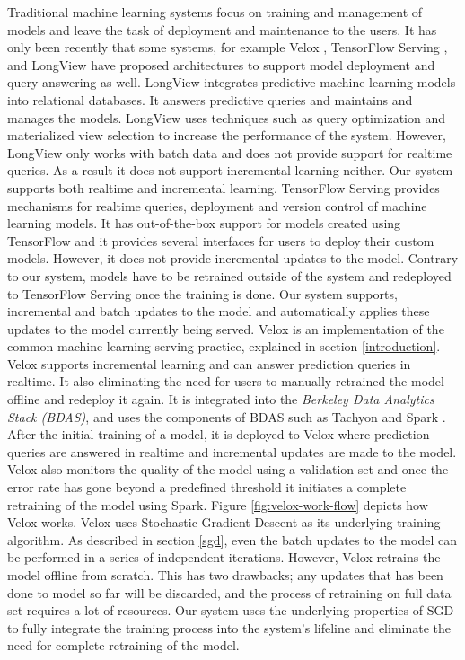 \documentclass{sig-alternate-05-2015}
\begin{document}
Traditional machine learning systems focus on training and management of models and leave the task of deployment and maintenance to the users. 
It has only been recently that some systems, for example Velox \cite{crankshaw2014missing}, TensorFlow Serving \cite{abadi2016tensorflow}, and LongView \cite{akdere2011case} have proposed architectures to support model deployment and query answering as well. 
LongView integrates predictive machine learning models into relational databases. 
It answers predictive queries and maintains and manages the models.
LongView uses techniques such as query optimization and materialized view selection to increase the performance of the system.
However, LongView only works with batch data and does not provide support for realtime queries. 
As a result it does not support incremental learning neither.
Our system supports both realtime and incremental learning.
TensorFlow Serving provides mechanisms for realtime queries, deployment and version control of machine learning models.
It has out-of-the-box support for models created using TensorFlow and it provides several interfaces for users to deploy their custom models.
However, it does not provide incremental updates to the model.
Contrary to our system, models have to be retrained outside of the system and redeployed to TensorFlow Serving once the training is done.
Our system supports, incremental and batch updates to the model and automatically applies these updates to the model currently being served.
Velox \cite{crankshaw2014missing} is an implementation of the common machine learning serving practice, explained in section \ref{introduction}.
Velox supports incremental learning and can answer prediction queries in realtime.
It also eliminating the need for users to manually retrained the model offline and redeploy it again.
It is integrated into the \textit{Berkeley Data Analytics Stack (BDAS)}, and uses the components of BDAS such as Tachyon \cite{li2014tachyon} and Spark \cite{zaharia2010spark}. 
After the initial training of a model, it is deployed to Velox where prediction queries are answered in realtime and incremental updates are made to the model.
Velox also monitors the quality of the model using a validation set and once the error rate has gone beyond a predefined threshold it initiates a complete retraining of the model using Spark. 
Figure \ref{fig:velox-work-flow} depicts how Velox works. 
Velox uses Stochastic Gradient Descent as its underlying training algorithm.
As described in section \ref{sgd}, even the batch updates to the model can be performed in a series of independent iterations.
However, Velox retrains the model offline from scratch.
This has two drawbacks; any updates that has been done to model so far will be discarded, and the process of retraining on full data set requires a lot of resources.
Our system uses the underlying properties of SGD to fully integrate the training process into the system's lifeline and eliminate the need for complete retraining of the model.
\end{document}

